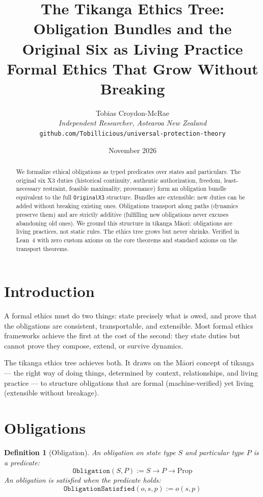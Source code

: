 \documentclass[12pt,a4paper]{article}
\title{The Tikanga Ethics Tree:\\[0.3em]
Obligation Bundles and the Original Six as Living Practice\\[0.5em]
\large Formal Ethics That Grow Without Breaking}
\author{Tobias Croydon-McRae\\
\textit{Independent Researcher, Aotearoa New Zealand}\\
\texttt{github.com/Tobillicious/universal-protection-theory}}
\date{November 2026}
\newtheorem{definition}[theorem]{Definition}
\begin{document}
\maketitle

\begin{abstract}
We formalize ethical obligations as typed predicates over states and
particulars. The original six X3 duties (historical continuity, authentic
authorization, freedom, least-necessary restraint, feasible maximality,
provenance) form an obligation bundle equivalent to the full
\texttt{OriginalX3} structure. Bundles are extensible: new duties can be
added without breaking existing ones. Obligations transport along paths
(dynamics preserve them) and are strictly additive (fulfilling new
obligations never excuses abandoning old ones). We ground this structure
in tikanga M\={a}ori: obligations are living practices, not static rules.
The ethics tree grows but never shrinks. Verified in Lean~4 with zero
custom axioms on the core theorems and standard axioms on the transport
theorems.
\end{abstract}

\section{Introduction}

A formal ethics must do two things: state precisely what is owed, and
prove that the obligations are consistent, transportable, and extensible.
Most formal ethics frameworks achieve the first at the cost of the second:
they state duties but cannot prove they compose, extend, or survive
dynamics.

The tikanga ethics tree achieves both. It draws on the M\={a}ori concept
of tikanga --- the right way of doing things, determined by context,
relationships, and living practice --- to structure obligations that are
formal (machine-verified) yet living (extensible without breakage).

\section{Obligations}

\begin{definition}[Obligation]
An obligation on state type $S$ and particular type $P$ is a predicate:
\[
\texttt{Obligation}(S, P) := S \to P \to \text{Prop}
\]
An obligation is satisfied when the predicate holds:
\[
\texttt{ObligationSatisfied}(o, s, p) := o(s, p)
\]
\end{definition}
\end{document}
